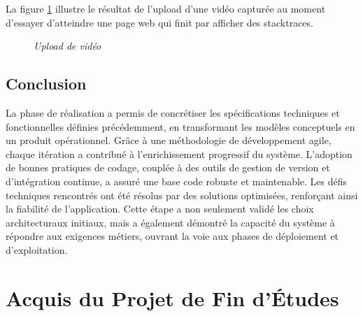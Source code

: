 \documentclass[12pt,a4paper]{report}
\begin{document}
	La figure \ref{fig:video} illustre le résultat de l'upload d'une vidéo capturée au moment d'essayer d'atteindre une page web qui finit par afficher des stacktraces.
	
	\begin{figure}[H]
		\centering
		\caption{\textit{Upload de vidéo}}
		\label{fig:video}
	\end{figure}
	
	\section{Conclusion}
	
	La phase de réalisation a permis de concrétiser les spécifications techniques et fonctionnelles définies précédemment, en transformant les modèles conceptuels en un produit opérationnel. Grâce à une méthodologie de développement agile, chaque itération a contribué à l’enrichissement progressif du système. L’adoption de bonnes pratiques de codage, couplée à des outils de gestion de version et d’intégration continue, a assuré une base code robuste et maintenable. Les défis techniques rencontrés ont été résolus par des solutions optimisées, renforçant ainsi la fiabilité de l’application. Cette étape a non seulement validé les choix architecturaux initiaux, mais a également démontré la capacité du système à répondre aux exigences métiers, ouvrant la voie aux phases de déploiement et d’exploitation.
	
	\chapter{Acquis du Projet de Fin d'Études}
	
\end{document}
